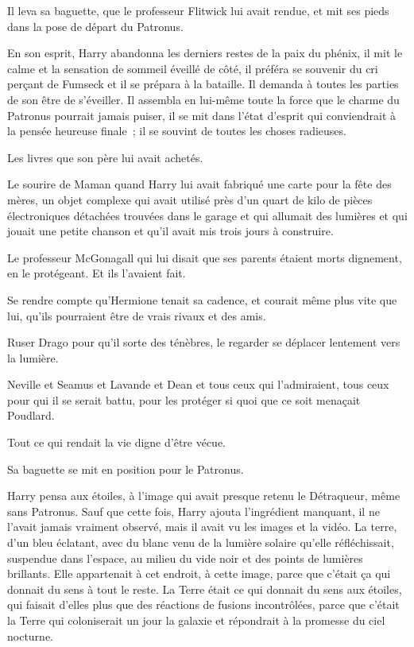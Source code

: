 Il leva sa baguette, que le professeur Flitwick lui avait rendue, et mit ses pieds dans la pose de départ du Patronus.

En son esprit, Harry abandonna les derniers restes de la paix du phénix, il mit le calme et la sensation de sommeil éveillé de côté, il préféra se souvenir du cri perçant de Fumseck et il se prépara à la bataille.
Il demanda à toutes les parties de son être de s'éveiller.
Il assembla en lui-même toute la force que le charme du Patronus pourrait jamais puiser, il se mit dans l'état d'esprit qui conviendrait à la pensée heureuse finale~; il se souvint de toutes les choses radieuses.

Les livres que son père lui avait achetés.

Le sourire de Maman quand Harry lui avait fabriqué une carte pour la fête des mères, un objet complexe qui avait utilisé près d'un quart de kilo de pièces électroniques détachées trouvées dans le garage et qui allumait des lumières et qui jouait une petite chanson et qu'il avait mis trois jours à construire.

Le professeur McGonagall qui lui disait que ses parents étaient morts dignement, en le protégeant.
Et ils l'avaient fait.

Se rendre compte qu'Hermione tenait sa cadence, et courait même plus vite que lui, qu'ils pourraient être de vrais rivaux et des amis.

Ruser Drago pour qu'il sorte des ténèbres, le regarder se déplacer lentement vers la lumière.

Neville et Seamus et Lavande et Dean et tous ceux qui l'admiraient, tous ceux pour qui il se serait battu, pour les protéger si quoi que ce soit menaçait Poudlard.

Tout ce qui rendait la vie digne d'être vécue.

Sa baguette se mit en position pour le Patronus.

Harry pensa aux étoiles, à l'image qui avait presque retenu le Détraqueur, même sans Patronus.
Sauf que cette fois, Harry ajouta l'ingrédient manquant, il ne l'avait jamais vraiment observé, mais il avait vu les images et la vidéo.
La terre, d'un bleu éclatant, avec du blanc venu de la lumière solaire qu'elle réfléchissait, suspendue dans l'espace, au milieu du vide noir et des points de lumières brillants.
Elle appartenait à cet endroit, à cette image, parce que c'était ça qui donnait du sens à tout le reste.
La Terre était ce qui donnait du sens aux étoiles, qui faisait d'elles plus que des réactions de fusions incontrôlées, parce que c'était la Terre qui coloniserait un jour la galaxie et répondrait à la promesse du ciel nocturne.

